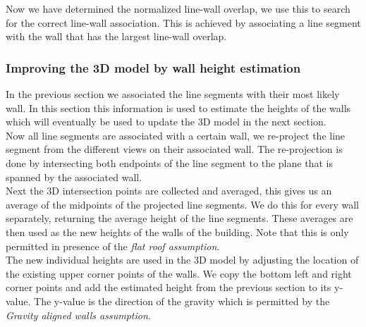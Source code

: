 	Now we have determined the normalized line-wall overlap, we use this to
	search for the correct line-wall association. This is achieved by
	associating a line segment with the wall that has the largest line-wall
	overlap.\\


\subsubsection{Improving the 3D model by wall height estimation}
	In the previous section we associated the line segments with their most
	likely wall. In this section this information is used to estimate the
	heights of the walls which will eventually be used to update the 3D model in the
	next section. \\
	Now all line segments are associated with a certain wall, we re-project the
	line segment from the different views on their associated wall. The
	re-projection is done by intersecting both endpoints of the line segment to
	the plane that is spanned by the associated wall.\\
	Next the 3D intersection points are collected and averaged, this gives us
	an average of the midpoints of the projected line segments. We do this for
	every wall separately, returning the average height of the line segments.
	These averages are then used as the new heights of the walls of the
	building. Note that this is only permitted in presence of the \emph{flat roof assumption}.\\
	The new individual heights are used in the 3D model by adjusting the
	location of the existing upper corner points of the walls. We copy the
	bottom left and right corner points and add the estimated height from the
	previous section to its y-value. The y-value is the direction of the
	gravity which is permitted by the \emph{Gravity aligned walls assumption}.

